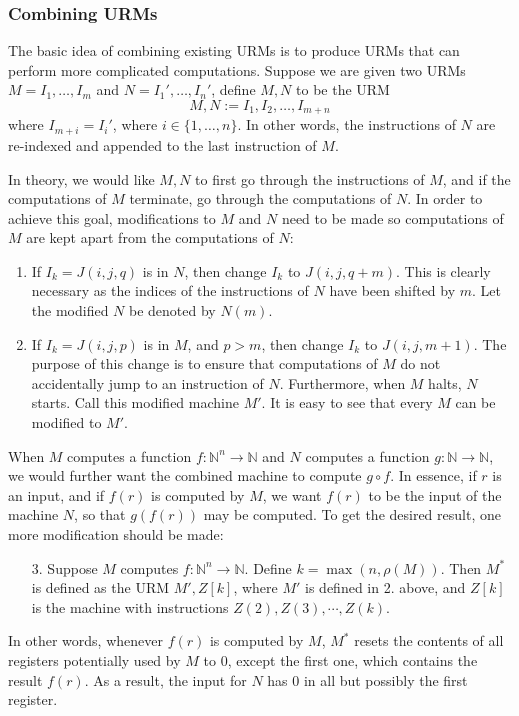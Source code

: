 \documentclass[12pt]{article}
\begin{document}
\subsubsection*{Combining URMs}

The basic idea of combining existing URMs is to produce URMs that can perform more complicated computations.  Suppose we are given two URMs $M=I_1,\ldots, I_m$ and $N=I_1',\ldots, I_n'$, define $M, N$ to be the URM $$M,N:=I_1,I_2,\ldots,I_{m+n}$$ where $I_{m+i}=I_i'$, where $i\in \lbrace 1,\ldots, n\rbrace$.  In other words, the instructions of $N$ are re-indexed and appended to the last instruction of $M$.

In theory, we would like $M, N$ to first go through the instructions of $M$, and if the computations of $M$ terminate, go through the computations of $N$.  In order to achieve this goal, modifications to $M$ and $N$ need to be made so computations of $M$ are kept apart from the computations of $N$:

\begin{enumerate}
\item If $I_k=J(i,j,q)$ is in $N$, then change $I_k$ to $J(i,j,q+m)$.  This is clearly necessary as the indices of the instructions of $N$ have been shifted by $m$.  Let the modified $N$ be denoted by $N(m)$.
\item If $I_k=J(i,j,p)$ is in $M$, and $p>m$, then change $I_k$ to $J(i,j,m+1)$.  The purpose of this change is to ensure that computations of $M$ do not accidentally jump to an instruction of $N$.  Furthermore, when $M$ halts, $N$ starts.  Call this modified machine $M'$.  It is easy to see that every $M$ can be modified to $M'$.
\end{enumerate}

When $M$ computes a function $f:\mathbb{N}^n \to \mathbb{N}$ and $N$ computes a function $g:\mathbb{N}\to \mathbb{N}$, we would further want the combined machine to compute $g\circ f$.  In essence, if $r$ is an input, and if $f(r)$ is computed by $M$, we want $f(r)$ to be the input of the machine $N$, so that $g(f(r))$ may be computed.  To get the desired result, one more modification should be made:

\begin{enumerate}
\item[3.] Suppose $M$ computes $f:\mathbb{N}^n \to \mathbb{N}$.  Define $k=\max(n,\rho(M))$.  Then $M^*$ is defined as the URM $M', Z[k]$, where $M'$ is defined in 2. above, and $Z[k]$ is the machine with instructions $Z(2),Z(3),\cdots, Z(k)$.
\end{enumerate}
In other words, whenever $f(r)$ is computed by $M$, $M^*$ resets the contents of all registers potentially used by $M$ to $0$, except the first one, which contains the result $f(r)$.  As a result, the input for $N$ has $0$ in all but possibly the first register.
\end{document}
